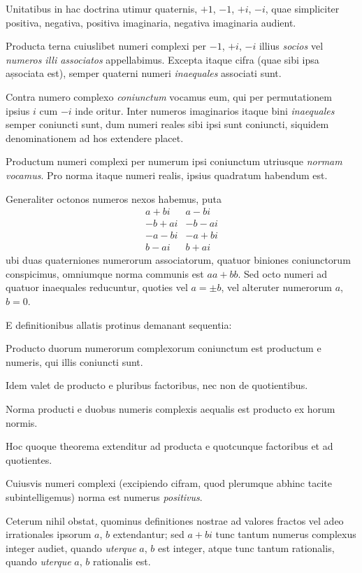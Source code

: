 \documentclass[twoside,12pt]{memoir}
\begin{document}
Unitatibus in hac doctrina utimur quaternis, \(+1\), \(-1\), \(+i\), \(-i\), quae simpliciter positiva, negativa, positiva imaginaria, negativa imaginaria audient.
 
Producta terna cuiuslibet numeri complexi per \(-1\), \(+i\), \(-i\) illius \textit{socios} vel \textit{numeros illi associatos} appellabimus. Excepta itaque cifra (quae sibi ipsa așsociata est), semper quaterni numeri \textit{inaequales} associati sunt.
 
Contra numero complexo \textit{coniunctum} vocamus eum, qui per permutationem ipsius \(i\) cum \(-i\) inde oritur. Inter numeros imaginarios itaque bini \textit{inaequales} semper coniuncti sunt, dum numeri reales sibi ipsi sunt coniuncti, siquidem denominationem ad hos extendere placet.
 
Productum numeri complexi per numerum ipsi coniunctum utriusque \textit{normam vocamus}. Pro norma itaque numeri realis, ipsius quadratum habendum est.
 
Generaliter octonos numeros nexos habemus, puta
\[\begin{array}{r|r}
a+b i & a-b i \\
-b+a i & -b-a i \\
-a-b i & -a+b i \\
b-a i & b+a i
\end{array}\]
ubi duas quaterniones numerorum associatorum, quatuor biniones coniunctorum conspicimus, omniumque norma communis est \(a a+b b\). Sed octo numeri ad quatuor inaequales reducuntur, quoties vel \(a= \pm b\), vel alteruter numerorum \(a\), \(b=0\).
 
E definitionibus allatis protinus demanant sequentia:
 
Producto duorum numerorum complexorum coniunctum est productum e numeris, qui illis coniuncti sunt.
 
Idem valet de producto e pluribus factoribus, nec non de quotientibus.
 
Norma producti e duobus numeris complexis aequalis est producto ex horum normis.
 
Hoc quoque theorema extenditur ad producta e quotcunque factoribus et ad quotientes.
 
Cuiusvis numeri complexi (excipiendo cifram, quod plerumque abhinc tacite subintelligemus) norma est numerus \textit{positivus}.
 
Ceterum nihil obstat, quominus definitiones nostrae ad valores fractos vel adeo irrationales ipsorum \(a\), \(b\) extendantur; sed \(a+b i\) tunc tantum numerus complexus integer audiet, quando \textit{uterque} \(a\), \(b\) est integer, atque tunc tantum rationalis, quando \textit{uterque} \(a\), \(b\) rationalis est.\pagebreak%
\end{document}
